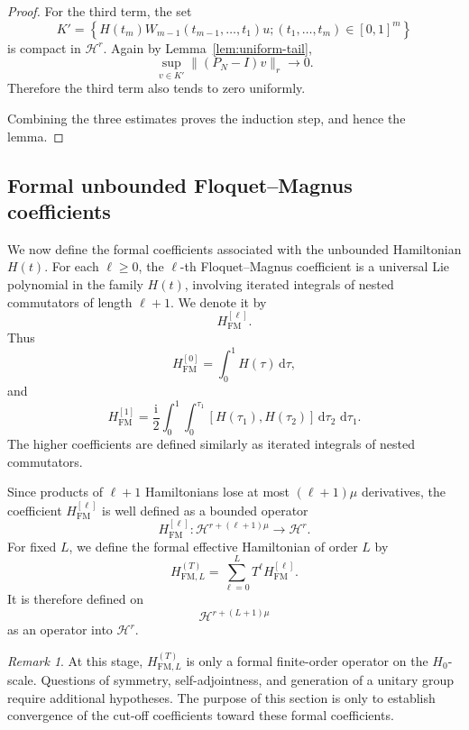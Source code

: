 \documentclass[11pt]{amsart}
\theoremstyle{plain}
\theoremstyle{definition}
\theoremstyle{remark}
\newtheorem{remark}[theorem]{Remark}
\newcommand{\Hilb}{\mathcal H}
\newcommand{\ii}{\mathrm i}
\newcommand{\dd}{\,\mathrm d}
\begin{document}
\begin{proof}
For the third term, the set
\[
        K'
        =
        \left\{
        H(t_m)W_{m-1}(t_{m-1},\ldots,t_1)u;
        (t_1,\ldots,t_m)\in[0,1]^m
        \right\}
\]
is compact in \(\Hilb^r\).  Again by Lemma~\ref{lem:uniform-tail},
\[
        \sup_{v\in K'}\|(P_N-I)v\|_r
        \longrightarrow0.
\]
Therefore the third term also tends to zero uniformly.

Combining the three estimates proves the induction step, and hence the
lemma.
\end{proof}

\subsection{Formal unbounded Floquet--Magnus coefficients}

We now define the formal coefficients associated with the unbounded
Hamiltonian \(H(t)\).  For each \(\ell\geq0\), the
\(\ell\)-th Floquet--Magnus coefficient is a universal Lie polynomial
in the family \(H(t)\), involving iterated integrals of nested
commutators of length \(\ell+1\).  We denote it by
\[
        H_{\mathrm{FM}}^{[\ell]}.
\]
Thus
\[
        H_{\mathrm{FM}}^{[0]}
        =
        \int_0^1 H(\tau)\dd\tau,
\]
and
\[
        H_{\mathrm{FM}}^{[1]}
        =
        \frac{\ii}{2}
        \int_0^1
        \int_0^{\tau_1}
        [H(\tau_1),H(\tau_2)]
        \dd\tau_2\,\dd\tau_1.
\]
The higher coefficients are defined similarly as iterated integrals of
nested commutators.

Since products of \(\ell+1\) Hamiltonians lose at most
\((\ell+1)\mu\) derivatives, the coefficient
\(H_{\mathrm{FM}}^{[\ell]}\) is well defined as a bounded operator
\[
        H_{\mathrm{FM}}^{[\ell]}:
        \Hilb^{r+(\ell+1)\mu}\longrightarrow \Hilb^r.
\]
For fixed \(L\), we define the formal effective Hamiltonian of order
\(L\) by
\[
        H_{\mathrm{FM},L}^{(T)}
        =
        \sum_{\ell=0}^{L}
        T^\ell H_{\mathrm{FM}}^{[\ell]}.
\]
It is therefore defined on
\[
        \Hilb^{r+(L+1)\mu}
\]
as an operator into \(\Hilb^r\).

\begin{remark}
At this stage, \(H_{\mathrm{FM},L}^{(T)}\) is only a formal finite-order
operator on the \(H_0\)-scale.  Questions of symmetry, self-adjointness,
and generation of a unitary group require additional hypotheses.  The
purpose of this section is only to establish convergence of the cut-off
coefficients toward these formal coefficients.
\end{remark}
\end{document}
